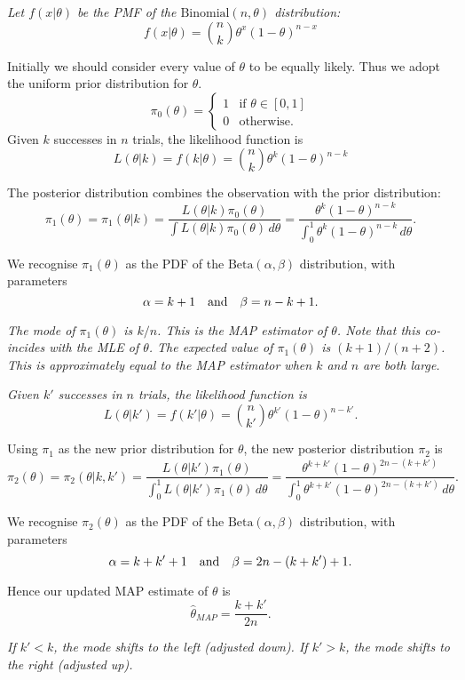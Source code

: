 \begin{solution}
\ben
\it %
Let $f(x|\theta)$ be the PMF of the $\text{Binomial}(n,\theta)$ distribution:
\[
f(x|\theta) = \binom{n}{k}\theta^x(1-\theta)^{n-x}
\]

Initially we should consider every value of $\theta$ to be equally likely. Thus we adopt the uniform prior distribution for $\theta$.
\[
\pi_0(\theta) = \left\{\begin{array}{ll}
	1	& \text{if } \theta\in[0,1] \\
	0	& \text{otherwise.}
\end{array}\right.
\]
Given $k$ successes in $n$ trials, the likelihood function is
\[
L(\theta|k) = f(k|\theta) = \binom{n}{k}\theta^k(1-\theta)^{n-k}
\]

The posterior distribution combines the observation with the prior distribution:
\[
\pi_1(\theta) = \pi_1(\theta|k)	
	= \frac{L(\theta|k)\pi_0(\theta)}{\int L(\theta|k)\pi_0(\theta)\,d\theta}
	= \frac{\theta^k(1-\theta)^{n-k}}{\int_0^1\theta^k(1-\theta)^{n-k}\,d\theta}.
\]

We recognise $\pi_1(\theta)$ as the PDF of the $\text{Beta}(\alpha,\beta)$ distribution, with parameters 
\[
\alpha=k+1 \text{\quad and\quad}\beta=n-k+1.
\]

\bit
\it The mode of $\pi_1(\theta)$ is $k/n$. This is the MAP estimator of $\theta$.
\it Note that this co-incides with the MLE of $\theta$.
\eit
\bit
\it The expected value of $\pi_1(\theta)$ is $(k+1)/(n+2)$.
\it This is approximately equal to the MAP estimator when $k$ and $n$ are both large.
\eit

\it %
Given $k'$ successes in $n$ trials, the likelihood function is
\[
L(\theta|k') = f(k'|\theta) = \binom{n}{k'}\theta^{k'}(1-\theta)^{n-k'}.
\]

Using $\pi_1$ as the new prior distribution for $\theta$, the new posterior distribution $\pi_2$ is
\[
\pi_2(\theta) = 
\pi_2(\theta|k,k')	
	= \frac{L(\theta|k')\pi_1(\theta)}{\int_0^1 L(\theta|k')\pi_1(\theta)\,d\theta} 
	= \frac{\theta^{k+k'}(1-\theta)^{2n-(k+k')}}{\int_0^1\theta^{k+k'}(1-\theta)^{2n-(k+k')}\,d\theta}.
\]

We recognise $\pi_2(\theta)$ as the PDF of the $\text{Beta}(\alpha,\beta)$ distribution, with parameters 
\[
\alpha=k+k'+1 \text{\quad and\quad}\beta=2n-(k+k')+1.
\]

Hence our updated MAP estimate of $\theta$ is
\[
\hat{\theta}_{MAP} = \frac{k+k'}{2n}.
\]

\bit
\it If $k'<k$, the mode shifts to the left (adjusted down).
\it If $k'>k$, the mode shifts to the right (adjusted up).
\eit
\een
\end{solution}

